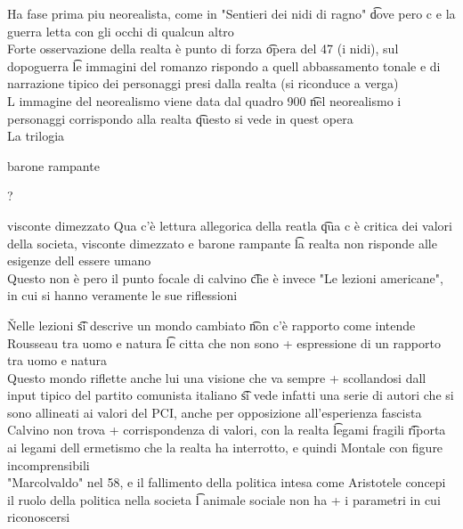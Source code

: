 \documentclass[12pt]{article}
\begin{document}
Ha fase prima piu neorealista, come in "Sentieri dei nidi di ragno" \t dove pero c e la guerra letta con gli occhi di qualcun altro \\
Forte osservazione della realta è punto di forza \t opera del 47 (i nidi), sul dopoguerra \t le immagini del romanzo rispondo a quell abbassamento tonale e di narrazione tipico dei personaggi presi dalla realta (si riconduce a verga) \\
L immagine del neorealismo viene data dal quadro 900 \t nel neorealismo i personaggi corrispondo alla realta \t questo si vede in quest opera \\
La trilogia
\bi
  \item barone rampante
  \item ?
  \item visconte dimezzato
\ei
Qua c'è lettura allegorica della reatla \t qua c è critica dei valori della societa, visconte dimezzato e barone rampante \t la realta non risponde alle esigenze dell essere umano \\
Questo non è pero il punto focale di calvino \t che è invece "Le lezioni americane", in cui si hanno veramente le sue riflessioni

\v

Nelle lezioni \t si descrive un mondo cambiato \t non c'è rapporto come intende Rousseau tra uomo e natura \t le citta che non sono + espressione di un rapporto tra uomo e natura \\
Questo mondo riflette anche lui una visione che va sempre + scollandosi dall input tipico del partito comunista italiano \t si vede infatti una serie di autori che si sono allineati ai valori del PCI, anche per opposizione all'esperienza fascista \\
Calvino non trova + corrispondenza di valori, con la realta \t legami fragili \t riporta ai legami dell ermetismo che la realta ha interrotto, e quindi Montale con figure incomprensibili \\
"Marcolvaldo" nel 58, e il fallimento della politica intesa come Aristotele concepi il ruolo della politica nella societa \t l animale sociale non ha + i parametri in cui riconoscersi
\end{document}
